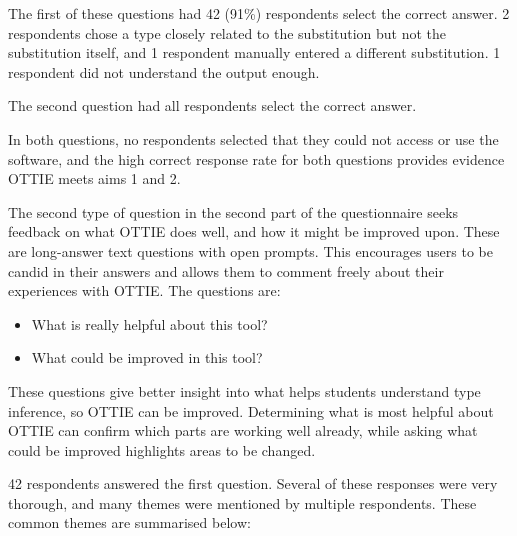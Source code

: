 \documentclass[a4paper,fleqn,oneside,12pt]{report}
\begin{document}
The first of these questions had 42 (91\%) respondents select the correct answer. 2 respondents chose a type closely related to the substitution but not the substitution itself, and 1 respondent manually entered a different substitution. 1 respondent did not understand the output enough.

The second question had all respondents select the correct answer.

In both questions, no respondents selected that they could not access or use the software, and the high correct response rate for both questions provides evidence OTTIE meets aims 1 and 2.

The second type of question in the second part of the questionnaire seeks feedback on what OTTIE does well, and how it might be improved upon. These are long-answer text questions with open prompts. This encourages users to be candid in their answers and allows them to comment freely about their experiences with OTTIE. The questions are:
\begin{itemize}
  \item What is really helpful about this tool?
  \item What could be improved in this tool?
\end{itemize}

These questions give better insight into what helps students understand type inference, so OTTIE can be improved. Determining what is most helpful about OTTIE can confirm which parts are working well already, while asking what could be improved highlights areas to be changed.

42 respondents answered the first question. Several of these responses were very thorough, and many themes were mentioned by multiple respondents. These common themes are summarised below:
\end{document}
